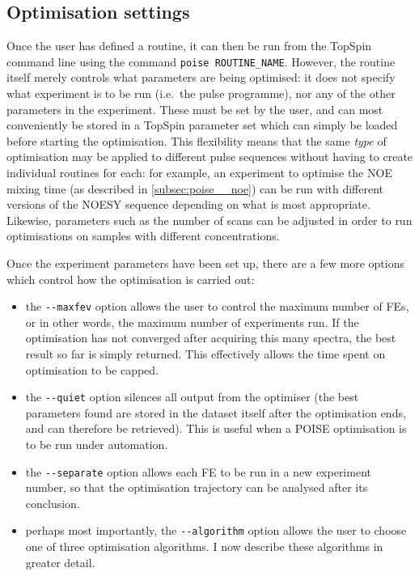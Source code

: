 \subsection{Optimisation settings}
\label{subsec:poise__settings}

Once the user has defined a routine, it can then be run from the TopSpin command line using the command \texttt{poise ROUTINE\_NAME}.
However, the routine itself merely controls what parameters are being optimised: it does not specify what experiment is to be run (i.e.\ the pulse programme), nor any of the other parameters in the experiment.
These must be set by the user, and can most conveniently be stored in a TopSpin parameter set which can simply be loaded before starting the optimisation.
This flexibility means that the same \textit{type} of optimisation may be applied to different pulse sequences without having to create individual routines for each: for example, an experiment to optimise the NOE mixing time (as described in \cref{subsec:poise__noe}) can be run with different versions of the NOESY sequence depending on what is most appropriate.
Likewise, parameters such as the number of scans can be adjusted in order to run optimisations on samples with different concentrations.

Once the experiment parameters have been set up, there are a few more options which control how the optimisation is carried out:

\begin{itemize}
    \item the \texttt{-\phantom{}-maxfev} option allows the user to control the maximum number of FEs, or in other words, the maximum number of experiments run.
        If the optimisation has not converged after acquiring this many spectra, the best result so far is simply returned.
        This effectively allows the time spent on optimisation to be capped.

    \item the \texttt{-\phantom{}-quiet} option silences all output from the optimiser (the best parameters found are stored in the dataset itself after the optimisation ends, and can therefore be retrieved).
        This is useful when a POISE optimisation is to be run under automation.
        
    \item the \texttt{-\phantom{}-separate} option allows each FE to be run in a new experiment number, so that the optimisation trajectory can be analysed after its conclusion.

    \item perhaps most importantly, the \texttt{-\phantom{}-algorithm} option allows the user to choose one of three optimisation algorithms.
        I now describe these algorithms in greater detail.
\end{itemize}
